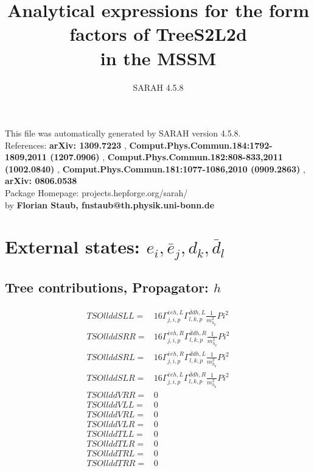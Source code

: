 \documentclass[A4,landscape]{article}
\begin{document}
\title{Analytical expressions for the form factors of TreeS2L2d\\ in the MSSM } 
 \author{SARAH 4.5.8} 
 \maketitle 
 \vspace{10cm} 
This file was automatically generated by SARAH version 4.5.8.  \\ 
References: {\bf arXiv: 1309.7223 }, {\bf Comput.Phys.Commun.184:1792-1809,2011 (1207.0906) }, {\bf Comput.Phys.Commun.182:808-833,2011 (1002.0840) }, {\bf Comput.Phys.Commun.181:1077-1086,2010 (0909.2863) }, {\bf arXiv: 0806.0538 } \\ 
Package Homepage: projects.hepforge.org/sarah/ \\ 
by {\bf Florian Staub, fnstaub@th.physik.uni-bonn.de} 
 \pagebreak 
 \tableofcontents 
 \pagebreak 
\section{External states: ${e_{{i}}, \bar{e}_{{j}}, d_{{k}}, \bar{d}_{{l}}}$} 
\subsection{Tree contributions, Propagator: $h$} 

\begin{align} 
  TSOllddSLL= & 16 \Gamma^{\bar{e}e h ,L}_{j, i, p} \Gamma^{\bar{d}d h ,L}_{l, k, p} \frac{1}{m^2_{h_{{p}}}} Pi^2 \\ 
  TSOllddSRR= & 16 \Gamma^{\bar{e}e h ,R}_{j, i, p} \Gamma^{\bar{d}d h ,R}_{l, k, p} \frac{1}{m^2_{h_{{p}}}} Pi^2 \\ 
  TSOllddSRL= & 16 \Gamma^{\bar{e}e h ,R}_{j, i, p} \Gamma^{\bar{d}d h ,L}_{l, k, p} \frac{1}{m^2_{h_{{p}}}} Pi^2 \\ 
  TSOllddSLR= & 16 \Gamma^{\bar{e}e h ,L}_{j, i, p} \Gamma^{\bar{d}d h ,R}_{l, k, p} \frac{1}{m^2_{h_{{p}}}} Pi^2 \\ 
  TSOllddVRR= & 0 \\ 
  TSOllddVLL= & 0 \\ 
  TSOllddVRL= & 0 \\ 
  TSOllddVLR= & 0 \\ 
  TSOllddTLL= & 0 \\ 
  TSOllddTLR= & 0 \\ 
  TSOllddTRL= & 0 \\ 
  TSOllddTRR= & 0 \\ 
\end{align} 
\end{document}
